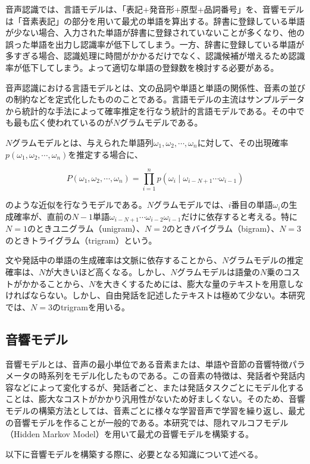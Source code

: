 音声認識では、言語モデルは、「表記+発音形+原型+品詞番号」を、音響モデルは「音素表記」の部分を用いて最尤の単語を算出する。辞書に登録している単語が少ない場合、入力された単語が辞書に登録されていないことが多くなり、他の誤った単語を出力し認識率が低下してしまう。一方、辞書に登録している単語が多すぎる場合、認識処理に時間がかかるだけでなく、認識候補が増えるため認識率が低下してしまう。よって適切な単語の登録数を検討する必要がある。

\par
音声認識における言語モデルとは、文の品詞や単語と単語の関係性、音素の並びの制約などを定式化したもののことである。言語モデルの主流はサンプルデータから統計的な手法によって確率推定を行なう統計的言語モデルである。その中でも最も広く使われているのが$N$グラムモデルである。\par
{}\par
$N$グラムモデルとは、与えられた単語列$\omega_1,\omega_2,\cdots,\omega_n$に対して、その出現確率$p(\omega_1,\omega_2,\cdots,\omega_n)$を推定する場合に、

\begin{equation}
P(\omega_1,\omega_2,\cdots,\omega_n)=\prod_{i=1}^{n}p(\omega_{i}\mid \omega_{i-N+1}\cdots \omega_{i-1})
\end{equation}

のような近似を行なうモデルである。$N$グラムモデルでは、$i$番目の単語$ω_i$の生成確率が、直前の$N-1$単語$ω_{i-N+1}\cdots ω_{i-2}ω_{i-1}$だけに依存すると考える。特に$N = 1$のときユニグラム（unigram）、$N = 2$のときバイグラム（bigram）、$N = 3$のときトライグラム（trigram）という。\par
文や発話中の単語の生成確率は文脈に依存することから、$N$グラムモデルの推定確率は、$N$が大きいほど高くなる。しかし、$N$グラムモデルは語彙の$N$乗のコストがかかることから、$N$を大きくするためには、膨大な量のテキストを用意しなければならない。しかし、自由発話を記述したテキストは極めて少ない。本研究では、$N = 3$のtrigramを用いる。\par



\subsection{音響モデル}
\label{acoustic_model}
音響モデルとは、音声の最小単位である音素または、単語や音節の音響特徴パラメータの時系列をモデル化したものである。この音素の特徴は、発話者や発話内容などによって変化するが、発話者ごと、または発話タスクごとにモデル化することは、膨大なコストがかかり汎用性がないため好ましくない。そのため、音響モデルの構築方法としては、音素ごとに様々な学習音声で学習を繰り返し、最尤の音響モデルを作ることが一般的である。本研究では、隠れマルコフモデル（Hidden Markov Model）を用いて最尤の音響モデルを構築する。\par
以下に音響モデルを構築する際に、必要となる知識について述べる。\par


